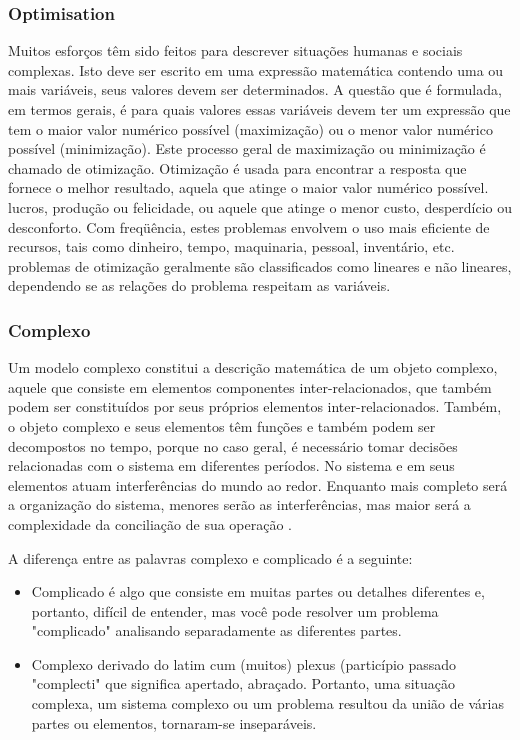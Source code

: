 \documentclass[11pt, letterpaper, portuguese]{article}
\begin{document}
\subsubsection{Optimisation}
    \par{Muitos esforços têm sido feitos para descrever situações humanas e sociais complexas. Isto deve ser escrito em uma expressão matemática contendo uma ou mais variáveis, seus valores devem ser determinados. A questão que é formulada, em termos gerais, é para quais valores essas variáveis devem ter um expressão que tem o maior valor numérico possível (maximização) ou o menor valor numérico possível (minimização). Este processo geral de maximização ou minimização é chamado de otimização. Otimização é usada para encontrar a resposta que fornece o melhor resultado, aquela que atinge o maior valor numérico possível.
lucros, produção ou felicidade, ou aquele que atinge o menor custo, desperdício ou desconforto. Com freqüência, estes problemas envolvem o uso mais eficiente de recursos, tais como dinheiro, tempo, maquinaria, pessoal, inventário, etc. problemas de otimização geralmente são classificados como lineares e não lineares, dependendo se as relações do problema respeitam as variáveis.
\cite{Arsham_1996}}

    
    \subsubsection{Complexo}
    \par{Um modelo complexo constitui a descrição matemática de um objeto complexo, aquele que consiste em elementos componentes inter-relacionados, que também podem ser constituídos por seus próprios elementos inter-relacionados. Também, o objeto complexo e seus elementos têm funções e também podem ser decompostos no tempo, porque no caso geral, é necessário tomar decisões relacionadas com o sistema em diferentes períodos. No sistema e em seus elementos atuam interferências do mundo ao redor. Enquanto mais completo será a organização do sistema, menores serão as interferências, mas maior será a complexidade da conciliação de sua operação  \cite{garfinkel_shevtsov_guo_2017}.}
    \par{A diferença entre as palavras complexo e complicado é a seguinte:
    \begin{itemize}
        \item Complicado é algo que consiste em muitas partes ou detalhes diferentes e, portanto, difícil de entender, mas você pode resolver um problema "complicado" analisando separadamente as diferentes partes.
        \item Complexo derivado do latim cum (muitos) plexus (particípio passado "complecti" que significa apertado, abraçado. Portanto, uma situação complexa, um sistema complexo ou um problema resultou da união de várias partes ou elementos, tornaram-se inseparáveis.
    \end{itemize}}
    
\end{document}
